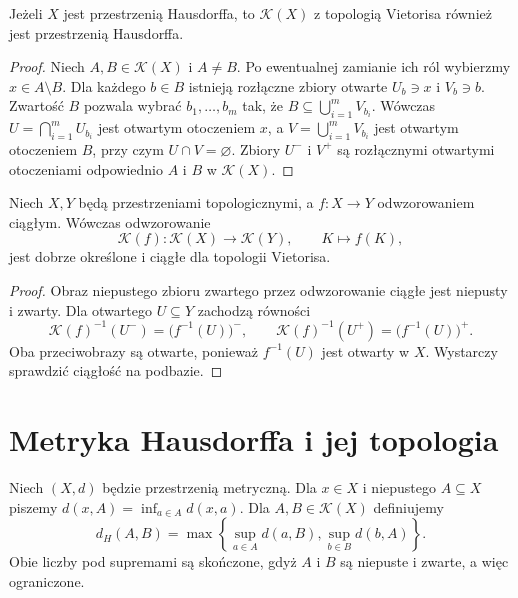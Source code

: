 \begin{twierdzenie}
\label{thm:topog21-vietoris-separation}
Jeżeli \(X\) jest przestrzenią Hausdorffa,
to \(\mathcal K(X)\) z topologią Vietorisa
również jest przestrzenią Hausdorffa.
\end{twierdzenie}
\begin{proof}
Niech \(A,B\in\mathcal K(X)\) i \(A\neq B\).
Po ewentualnej zamianie ich ról wybierzmy \(x\in A\setminus B\).
Dla każdego \(b\in B\) istnieją rozłączne zbiory otwarte
\(U_b\ni x\) i \(V_b\ni b\).
Zwartość \(B\) pozwala wybrać \(b_1,\ldots,b_m\)
tak, że \(B\subseteq\bigcup_{i=1}^m V_{b_i}\).
Wówczas \(U=\bigcap_{i=1}^m U_{b_i}\) jest otwartym
otoczeniem \(x\), a \(V=\bigcup_{i=1}^mV_{b_i}\)
jest otwartym otoczeniem \(B\), przy czym
\(U\cap V=\varnothing\).
Zbiory \(U^-\) i \(V^+\) są rozłącznymi otwartymi
otoczeniami odpowiednio \(A\) i \(B\)
w \(\mathcal K(X)\).
\end{proof}

\begin{stwierdzenie}
\label{prop:topog21-induced}
Niech \(X,Y\) będą przestrzeniami topologicznymi,
a \(f\colon X\to Y\) odwzorowaniem ciągłym.
Wówczas odwzorowanie
\[
 \mathcal K(f)\colon\mathcal K(X)\to\mathcal K(Y),
 \qquad K\longmapsto f(K),
\]
jest dobrze określone i ciągłe dla topologii Vietorisa.
\end{stwierdzenie}
\begin{proof}
Obraz niepustego zbioru zwartego przez odwzorowanie
ciągłe jest niepusty i zwarty.
Dla otwartego \(U\subseteq Y\) zachodzą równości
\[
 \mathcal K(f)^{-1}(U^-)=\bigl(f^{-1}(U)\bigr)^-,
 \qquad
 \mathcal K(f)^{-1}(U^+)=\bigl(f^{-1}(U)\bigr)^+.
\]
Oba przeciwobrazy są otwarte, ponieważ \(f^{-1}(U)\)
jest otwarty w \(X\). Wystarczy sprawdzić
ciągłość na podbazie.
\end{proof}

\section{Metryka Hausdorffa i jej topologia}
\label{sec:topog21-hausdorff}

\begin{definicja}
\label{def:topog21-hausdorff}
Niech \((X,d)\) będzie przestrzenią metryczną.
Dla \(x\in X\) i niepustego \(A\subseteq X\) piszemy
\(d(x,A)=\inf_{a\in A}d(x,a)\).
Dla \(A,B\in\mathcal K(X)\) definiujemy
\[
 d_H(A,B)=
 \max\left\{\sup_{a\in A}d(a,B),
             \sup_{b\in B}d(b,A)\right\}.
\]
Obie liczby pod supremami są skończone,
gdyż \(A\) i \(B\) są niepuste i zwarte,
a więc ograniczone.
\end{definicja}

